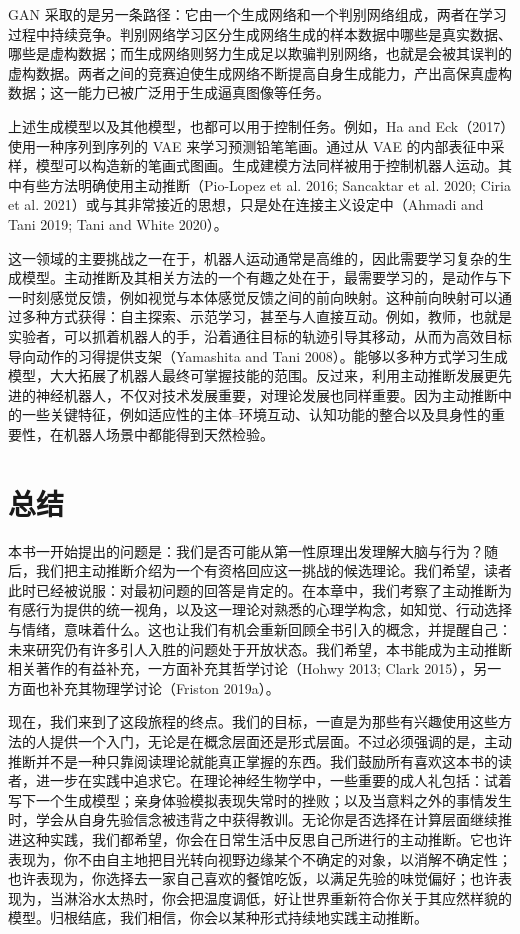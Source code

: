 GAN 采取的是另一条路径：它由一个生成网络和一个判别网络组成，两者在学习过程中持续竞争。判别网络学习区分生成网络生成的样本数据中哪些是真实数据、哪些是虚构数据；而生成网络则努力生成足以欺骗判别网络，也就是会被其误判的虚构数据。两者之间的竞赛迫使生成网络不断提高自身生成能力，产出高保真虚构数据；这一能力已被广泛用于生成逼真图像等任务。

上述生成模型以及其他模型，也都可以用于控制任务。例如，Ha and Eck（2017）使用一种序列到序列的 VAE 来学习预测铅笔笔画。通过从 VAE 的内部表征中采样，模型可以构造新的笔画式图画。生成建模方法同样被用于控制机器人运动。其中有些方法明确使用主动推断（Pio-Lopez et al. 2016; Sancaktar et al. 2020; Ciria et al. 2021）或与其非常接近的思想，只是处在连接主义设定中（Ahmadi and Tani 2019; Tani and White 2020）。

这一领域的主要挑战之一在于，机器人运动通常是高维的，因此需要学习复杂的生成模型。主动推断及其相关方法的一个有趣之处在于，最需要学习的，是动作与下一时刻感觉反馈，例如视觉与本体感觉反馈之间的前向映射。这种前向映射可以通过多种方式获得：自主探索、示范学习，甚至与人直接互动。例如，教师，也就是实验者，可以抓着机器人的手，沿着通往目标的轨迹引导其移动，从而为高效目标导向动作的习得提供支架（Yamashita and Tani 2008）。能够以多种方式学习生成模型，大大拓展了机器人最终可掌握技能的范围。反过来，利用主动推断发展更先进的神经机器人，不仅对技术发展重要，对理论发展也同样重要。因为主动推断中的一些关键特征，例如适应性的主体--环境互动、认知功能的整合以及具身性的重要性，在机器人场景中都能得到天然检验。

\section{总结}

本书一开始提出的问题是：我们是否可能从第一性原理出发理解大脑与行为？随后，我们把主动推断介绍为一个有资格回应这一挑战的候选理论。我们希望，读者此时已经被说服：对最初问题的回答是肯定的。在本章中，我们考察了主动推断为有感行为提供的统一视角，以及这一理论对熟悉的心理学构念，如知觉、行动选择与情绪，意味着什么。这也让我们有机会重新回顾全书引入的概念，并提醒自己：未来研究仍有许多引人入胜的问题处于开放状态。我们希望，本书能成为主动推断相关著作的有益补充，一方面补充其哲学讨论（Hohwy 2013; Clark 2015），另一方面也补充其物理学讨论（Friston 2019a）。

现在，我们来到了这段旅程的终点。我们的目标，一直是为那些有兴趣使用这些方法的人提供一个入门，无论是在概念层面还是形式层面。不过必须强调的是，主动推断并不是一种只靠阅读理论就能真正掌握的东西。我们鼓励所有喜欢这本书的读者，进一步在实践中追求它。在理论神经生物学中，一些重要的成人礼包括：试着写下一个生成模型；亲身体验模拟表现失常时的挫败；以及当意料之外的事情发生时，学会从自身先验信念被违背之中获得教训。无论你是否选择在计算层面继续推进这种实践，我们都希望，你会在日常生活中反思自己所进行的主动推断。它也许表现为，你不由自主地把目光转向视野边缘某个不确定的对象，以消解不确定性；也许表现为，你选择去一家自己喜欢的餐馆吃饭，以满足先验的味觉偏好；也许表现为，当淋浴水太热时，你会把温度调低，好让世界重新符合你关于其应然样貌的模型。归根结底，我们相信，你会以某种形式持续地实践主动推断。

